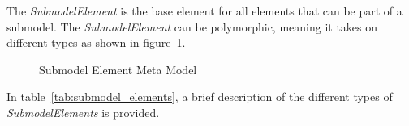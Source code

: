 The \textit{SubmodelElement} is the base element for all elements that can be part of a submodel.
The \textit{SubmodelElement} can be polymorphic, meaning it takes on different types as shown in figure~\ref{fig:SubmodelElement_MetaModel}.

\begin{landscape}
\begin{figure}[p]
    \centering
    
    \vspace{-5cm}
    \caption{Submodel Element Meta Model \cite{plattformi40_aas_part1_v3}}
    \label{fig:SubmodelElement_MetaModel}
\end{figure}
\end{landscape}
\newpage 

In table~\ref{tab:submodel_elements}, a brief description of the different types of \textit{SubmodelElements} is provided.


